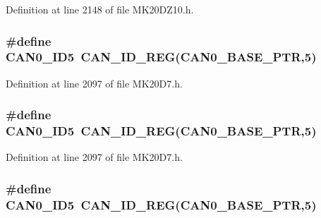 Definition at line 2148 of file M\+K20\+D\+Z10.\+h.

\subsubsection[{\texorpdfstring{C\+A\+N0\+\_\+\+I\+D5}{CAN0_ID5}}]{\setlength{\rightskip}{0pt plus 5cm}\#define C\+A\+N0\+\_\+\+I\+D5~{\bf C\+A\+N\+\_\+\+I\+D\+\_\+\+R\+EG}({\bf C\+A\+N0\+\_\+\+B\+A\+S\+E\+\_\+\+P\+TR},5)}\hypertarget{group___c_a_n___register___accessor___macros_ga619e52c4b59a86d5bfd39fe505022eae}{}\label{group___c_a_n___register___accessor___macros_ga619e52c4b59a86d5bfd39fe505022eae}


Definition at line 2097 of file M\+K20\+D7.\+h.

\subsubsection[{\texorpdfstring{C\+A\+N0\+\_\+\+I\+D5}{CAN0_ID5}}]{\setlength{\rightskip}{0pt plus 5cm}\#define C\+A\+N0\+\_\+\+I\+D5~{\bf C\+A\+N\+\_\+\+I\+D\+\_\+\+R\+EG}({\bf C\+A\+N0\+\_\+\+B\+A\+S\+E\+\_\+\+P\+TR},5)}\hypertarget{group___c_a_n___register___accessor___macros_ga619e52c4b59a86d5bfd39fe505022eae}{}\label{group___c_a_n___register___accessor___macros_ga619e52c4b59a86d5bfd39fe505022eae}


Definition at line 2097 of file M\+K20\+D7.\+h.

\subsubsection[{\texorpdfstring{C\+A\+N0\+\_\+\+I\+D5}{CAN0_ID5}}]{\setlength{\rightskip}{0pt plus 5cm}\#define C\+A\+N0\+\_\+\+I\+D5~{\bf C\+A\+N\+\_\+\+I\+D\+\_\+\+R\+EG}({\bf C\+A\+N0\+\_\+\+B\+A\+S\+E\+\_\+\+P\+TR},5)}\hypertarget{group___c_a_n___register___accessor___macros_ga619e52c4b59a86d5bfd39fe505022eae}{}\label{group___c_a_n___register___accessor___macros_ga619e52c4b59a86d5bfd39fe505022eae}


